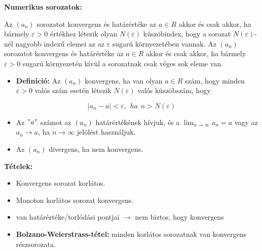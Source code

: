 \documentclass[12pt,a4paper]{article}
\begin{document}
\textbf{Numerikus sorozatok:}

\begin{tcolorbox}[colback=green!5!white,colframe=green!60!black,title= 1. Numerikus sorozat határértéke]
Az \((a_n)\) sorozatot konvergens és határértéke az \(a \in R\) akkor és csak akkor, ha bármely \(\varepsilon > 0\) értékhez
létezik olyan \(N(\varepsilon)\) küszöbindex, hogy a sorozat \(N(\varepsilon)\)-nél nagyobb indexű elemei az az \(\varepsilon\) sugarú környezetében vannak.
Az \((a_n)\) sorozatot konvergens és határértéke az \(a \in R\) akkor és csak akkor, ha bármely \(\varepsilon > 0\) sugarú
környezetén kívül a sorozatnak csak véges sok eleme van.
\end{tcolorbox}

\begin{tcolorbox}[colback=green!5!white,colframe=green!60!black,title= 2. Konvergens{,} divergens sorozat]
    \begin{itemize}
        \item \textbf{Definíció:} Az \((a_n)\) konvergens, ha van olyan \(a \in R\) szám, hogy minden \(\varepsilon > 0\) valós szám esetén létezik \(N(\varepsilon)\) valós küszöbszám, hogy
    \end{itemize}
        $$\left\lvert a_n -a\right\rvert < \varepsilon,\hspace{5pt}ha\hspace{5pt}n > N(\varepsilon)$$
    \begin{itemize}
        \item Az \("a"\) számot az \((a_n)\) határértékének hívjuk, és a \(\lim_{n \to \infty} a_n = a\)  vagy az \(a_n \to a\), ha \(n \to \infty \) jelölést használjuk.
        \item Az \((a_n)\) divergens, ha nem konvergens.
    \end{itemize}
\textbf{Tételek:}
\begin{itemize}
    \item Konvergens sorozat korlátos.
    \item Monoton korlátos sorozat konvergens.
    \item van határértéke/torlódási pontjai \(\rightarrow\) nem biztos, hogy konvergens
    \item \textbf{Bolzano-Weierstrass-tétel:} minden korlátos sorozatnak van konvergens részsorozata.
\end{itemize}
\end{tcolorbox}
\end{document}

